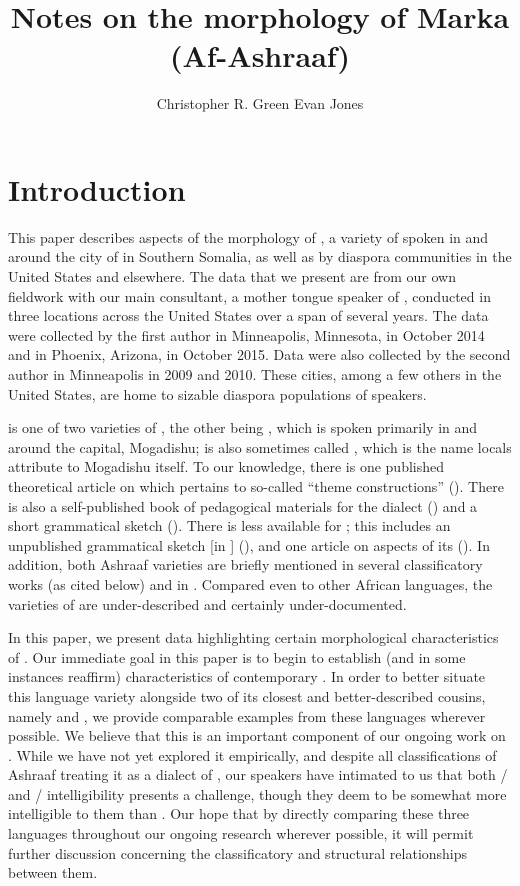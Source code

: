 \documentclass[output=paper]{../langsci/langscibook}
\author{Christopher R. Green\affiliation{Syracuse University} 
\lastand Evan Jones\affiliation{University of Maryland}  
}
\title{Notes on the morphology of Marka (Af-Ashraaf)}
\begin{document}
\newcommand{\emphgj}[1]{\textit{#1}} %
\section{Introduction} 
 

 This paper describes aspects of the morphology of , a variety of  spoken in and around the city of  in Southern Somalia, as well as by diaspora communities in the United States and elsewhere. The data that we present are from our own fieldwork with our main consultant, a mother tongue speaker of , conducted in three locations across the United States over a span of several years. The data were collected by the first author in Minneapolis, Minnesota, in October 2014 and in Phoenix, Arizona, in October 2015. Data were also collected by the second author in Minneapolis in 2009 and 2010. These cities, among a few others in the United States, are home to sizable diaspora populations of  speakers. 
 
  is one of two varieties of , the other being , which is spoken primarily in and around the  capital, Mogadishu;  is also sometimes called , which is the name locals attribute to Mogadishu itself. To our knowledge, there is one published theoretical article on  which pertains to so-called ``{theme constructions}'' (\citealt{Ajello1984}). There is also a self-published book of pedagogical materials for the dialect (\citealt{Abo2007}) and a short grammatical sketch (\citealt{Moreno1953}). There is less available for ; this includes an unpublished grammatical sketch [in ] (\citealt{Lamberti1980}), and one article on aspects of its  (\citealt{Ajello1988}). In addition, both Ashraaf varieties are briefly mentioned in several classificatory works (as cited below) and in \citet{Banti2011}. Compared even to other African languages, the varieties of  are under-described and certainly under-documented.
 
 In this paper, we present data highlighting certain morphological characteristics of . Our immediate goal in this paper is to begin to establish (and in some instances reaffirm) characteristics of contemporary . In order to better situate this language variety alongside two of its closest and better-described cousins, namely  and , we provide comparable examples from these languages wherever possible. We believe that this is an important component of our ongoing work on . While we have not yet explored it empirically, and despite all classifications of Ashraaf treating it as a dialect of , our  speakers have intimated to us that both / and / intelligibility presents a challenge, though they deem  to be somewhat more intelligible to them than . Our hope that by directly comparing these three languages throughout our ongoing research wherever possible, it will permit further discussion concerning the classificatory and structural relationships between them. 
 
\end{document}
